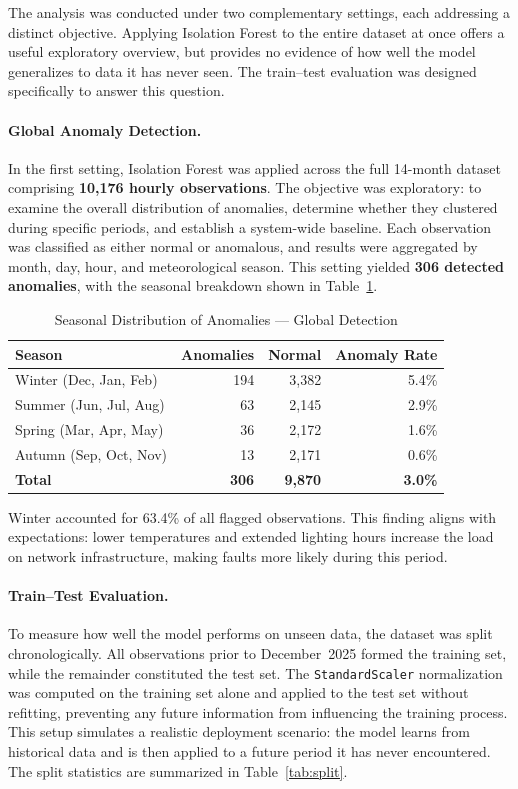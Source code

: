 \documentclass{article}
\begin{document}
The analysis was conducted under two complementary settings, each
addressing a distinct objective. Applying Isolation Forest to the
entire dataset at once offers a useful exploratory overview, but
provides no evidence of how well the model generalizes to data it has
never seen. The train--test evaluation was designed specifically to
answer this question.

\paragraph{Global Anomaly Detection.}
In the first setting, Isolation Forest was applied across the full
14-month dataset comprising \textbf{10,176 hourly observations}. The
objective was exploratory: to examine the overall distribution of
anomalies, determine whether they clustered during specific periods,
and establish a system-wide baseline. Each observation was classified
as either normal or anomalous, and results were aggregated by month,
day, hour, and meteorological season. This setting yielded
\textbf{306 detected anomalies}, with the seasonal breakdown shown in
Table~\ref{tab:seasonal}.

\begin{table}[h]
\centering
\caption{Seasonal Distribution of Anomalies --- Global Detection}
\label{tab:seasonal}
\begin{tabular}{lrrr}
\hline
\textbf{Season} & \textbf{Anomalies} & \textbf{Normal} & \textbf{Anomaly Rate} \\
\hline
Winter   (Dec, Jan, Feb) & 194 & 3{,}382 & 5.4\% \\
Summer   (Jun, Jul, Aug) &  63 & 2{,}145 & 2.9\% \\
Spring   (Mar, Apr, May) &  36 & 2{,}172 & 1.6\% \\
Autumn   (Sep, Oct, Nov) &  13 & 2{,}171 & 0.6\% \\
\hline
\textbf{Total} & \textbf{306} & \textbf{9{,}870} & \textbf{3.0\%} \\
\hline
\end{tabular}
\end{table}

Winter accounted for 63.4\% of all flagged observations. This finding
aligns with expectations: lower temperatures and extended lighting hours
increase the load on network infrastructure, making faults more likely
during this period.

\paragraph{Train--Test Evaluation.}
To measure how well the model performs on unseen data, the dataset was
split chronologically. All observations prior to December~2025 formed
the training set, while the remainder constituted the test set. The
\texttt{StandardScaler} normalization was computed on the training set
alone and applied to the test set without refitting, preventing any
future information from influencing the training process. This setup
simulates a realistic deployment scenario: the model learns from
historical data and is then applied to a future period it has never
encountered. The split statistics are summarized in
Table~\ref{tab:split}.
\end{document}
